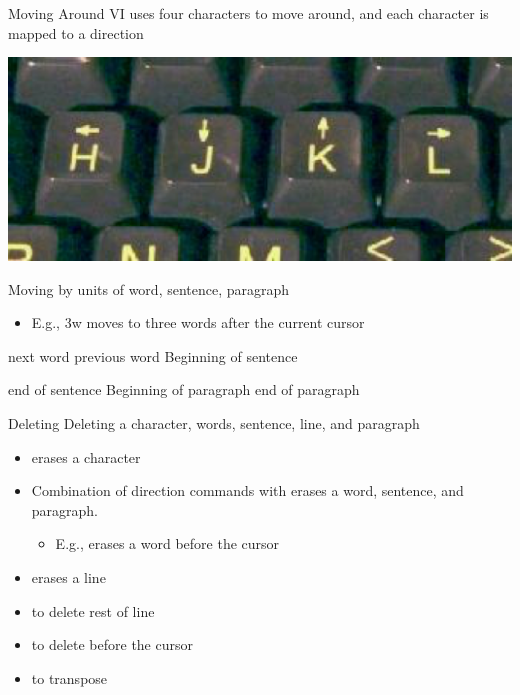 \documentclass[newPxFont,sthlmFooter,nooffset]{beamer}
\begin{document}
\begin{frame}[t]{Moving Around}
VI uses four characters to move around, and each character is mapped to a direction

\begin{center}
 \includegraphics[width=0.7\linewidth]{./figure/vi_directions.png}
\end{center}

Moving by units of word, sentence, paragraph
\begin{itemize}
\item E.g., 3w moves to three words after the current cursor
\end{itemize}


 next word \hfill {} previous word \hfill \keystroke{(} Beginning of sentence

\bigskip
\keystroke{)} end of sentence \hfill \keystroke{\{} Beginning of paragraph \hfill \keystroke{\}} end of paragraph
\end{frame}


\begin{frame}[t]{Deleting}
Deleting a character, words, sentence, line, and paragraph
\begin{itemize}
 \item {} erases a character
 \item Combination of direction commands with  erases a word, sentence, and paragraph.
\begin{itemize}
\item E.g.,  erases a word before the cursor
\end{itemize}
 \item {} erases a line
 \item {} to delete rest of line
 \item {} to delete before the cursor
 \item {} to transpose
\end{itemize}

\end{frame}
\end{document}
